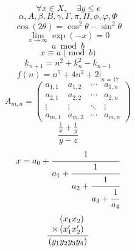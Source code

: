 \documentclass[12pt, twoside, final]{ruost}
\begin{document}
\begin{OST}
					\begin{equation}
						\forall x \in X, \quad \exists y \leq \epsilon
					\end{equation}
					\begin{equation}
						\alpha, A, \beta, B, \gamma, \Gamma, \pi, \Pi, \phi, \varphi, \Phi
					\end{equation}
					\begin{equation}
					\cos (2\theta) = \cos^2 \theta - \sin^2 \theta
					\end{equation}
					\begin{equation}
					\lim_{x \to \infty} \exp(-x) = 0
					\end{equation}
					\begin{equation}
					a \bmod b
					\end{equation}
					\begin{equation}
					x \equiv a \pmod b
					\end{equation}
					\begin{equation}
					k_{n+1} = n^2 + k_n^2 - k_{n-1}
					\end{equation}
					\begin{equation}
					f(n) = n^5 + 4n^2 + 2 |_{n=17}
					\end{equation}
					\begin{equation}
					A_{m,n} =
					\begin{pmatrix}
					a_{1,1} & a_{1,2} & \cdots & a_{1,n} \\
					a_{2,1} & a_{2,2} & \cdots & a_{2,n} \\
					\vdots  & \vdots  & \ddots & \vdots  \\
					a_{m,1} & a_{m,2} & \cdots & a_{m,n}
					\end{pmatrix}
					\end{equation}
					\begin{equation}
					\frac{\frac{1}{x}+\frac{1}{y}}{y-z}
					\end{equation}
					\begin{equation}
					  x = a_0 + \cfrac{1}{a_1
					  	+ \cfrac{1}{a_2
					  		+ \cfrac{1}{a_3 + \cfrac{1}{a_4} } } }
					\end{equation}
					\begin{equation}
					\frac{
						\begin{array}[b]{r}
						\left( x_1 x_2 \right)\\
						\times \left( x'_1 x'_2 \right)
						\end{array}
					}{
						\left( y_1y_2y_3y_4 \right)
					}

\end{equation}
\end{OST}
\end{document}

